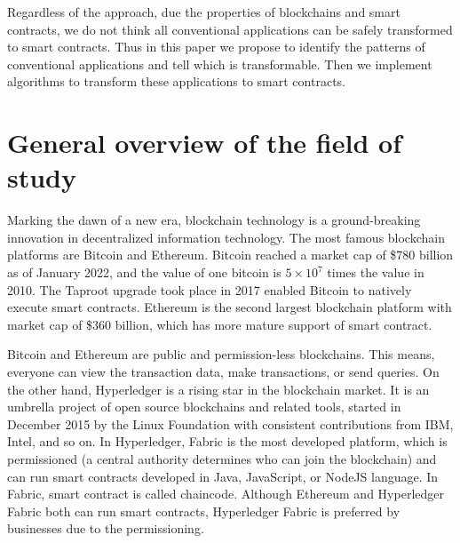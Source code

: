 Regardless of the approach,
due the properties of blockchains and smart contracts, we do not think all conventional applications can be safely transformed to smart contracts.
Thus in this paper we propose to identify the patterns of conventional applications and tell which is transformable.
Then we implement algorithms to transform these applications to smart contracts.


\section{General overview of the field of study}


Marking the dawn of a new era, blockchain technology is a ground-breaking innovation in decentralized information technology.
The most famous blockchain platforms are Bitcoin and Ethereum.
Bitcoin reached a market cap of \$780 billion as of January 2022, and the value of one bitcoin is $5 \times 10^7$ times the value in 2010.
The Taproot upgrade took place in 2017 enabled Bitcoin to natively execute smart contracts.
Ethereum is the second largest blockchain platform with market cap of \$360 billion, which has more mature support of smart contract.

Bitcoin and Ethereum are public and permission-less blockchains.
This means, everyone can view the transaction data, make transactions, or send queries.
On the other hand, Hyperledger is a rising star in the blockchain market. It is an umbrella project of open source blockchains and related tools, started in December 2015 by the Linux Foundation with consistent contributions from IBM, Intel, and so on.
In Hyperledger, Fabric is the most developed platform, which is permissioned (a central authority determines who can join the blockchain) and can run smart contracts developed in Java, JavaScript, or NodeJS language.
In Fabric, smart contract is called chaincode. Although Ethereum and Hyperledger Fabric both can run smart contracts, Hyperledger Fabric is preferred by businesses due to the permissioning.










